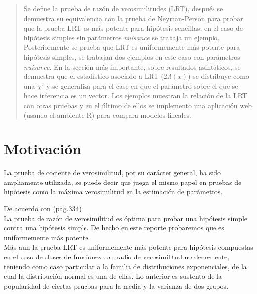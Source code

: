 \documentclass[peerreview]{IEEEtran}
\newenvironment{cframed}[1][blue]
  {\begin{tcolorbox}[colframe=#1,colback=white]}
  {\end{tcolorbox}}
\begin{document}
\newcommand{\HRule}{\rule{\linewidth}{0.5mm}}


\break

\tableofcontents



\newpage
\IEEEpeerreviewmaketitle
\break
\begin{abstract}
Se define la prueba de razón de verosimilitudes (LRT), después se demuestra su equivalencia con la prueba de Neyman-Person para probar que la prueba LRT es más potente para hipótesis sencillas, en el caso de hipótesis simples sin parámetros \textit{ nuisance} se trabaja un ejemplo. Posteriormente se prueba que LRT es uniformemente más potente para hipótesis simples, se trabajan dos ejemplos en este caso con parámetros \textit{nuisance}. En la sección más importante, sobre resultados asintóticos, se demuestra que el estadístico asociado a LRT ($2\Lambda(x)$) se distribuye como una $\chi^2$ y se generaliza para el caso en que el parámetro sobre el que se hace inferencia es un vector. Los ejemplos muestran la relación de la LRT con otras pruebas y en el último de ellos se  implemento una aplicación web (usando el ambiente R\cite{R}) para compara modelos lineales.

\end{abstract}
\section{Motivación}
\begin{cframed}[violet]
La prueba de cociente de verosimilitud, por su carácter general, ha sido ampliamente utilizada, se puede decir que juega el mismo papel en pruebas de hipótesis como la máxima verosimilitud en la estimación de parámetros.

De acuerdo con \cite{Rice} (pag.334) \\
La prueba de razón de verosimilitud es óptima para probar una hipótesis simple contra una hipótesis simple. De hecho en este reporte probaremos que es uniformemente más potente.\\

Más aun la prueba LRT es uniformemente más potente para hipótesis compuestas en el caso de clases de funciones con radio de verosimilitud no decreciente, teniendo como caso particular a la familia de distribuciones exponenciales, de la cual la distribución normal es una de ellas. Lo anterior es sustento de la popularidad de ciertas pruebas para la media y la varianza de dos grupos.
\end{cframed}
\end{document}
